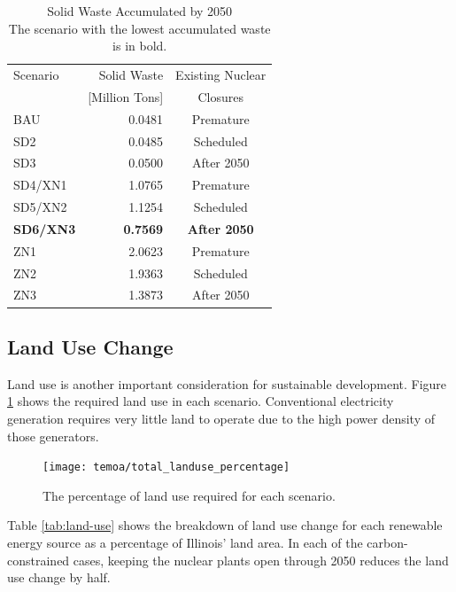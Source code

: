 \begin{table}[H]
  \centering
  \caption{Solid Waste Accumulated by 2050\\The scenario with the
  lowest accumulated waste is in bold.}
  \label{tab:total-waste}
  \begin{tabular}{lrc}
    \hline
    Scenario & Solid Waste & Existing Nuclear \\
    & [Million Tons]& Closures \\
    \hline
    BAU & 0.0481& Premature\\
    SD2 & 0.0485& Scheduled\\
    SD3 & 0.0500& After 2050\\
    SD4/XN1 & 1.0765 & Premature\\
    SD5/XN2 & 1.1254& Scheduled\\
    \textbf{SD6/XN3} & \textbf{0.7569}& \textbf{After 2050}\\
    ZN1 & 2.0623& Premature\\
    ZN2 & 1.9363& Scheduled\\
    ZN3 & 1.3873& After 2050\\
    \hline
  \end{tabular}
\end{table}

\subsection{Land Use Change}

Land use is another important consideration for sustainable development. Figure
\ref{fig:land-use-percentage} shows the required land use in each scenario.
Conventional electricity generation requires very little land to operate due
to the high power density of those generators.

\begin{figure}[H]
  \centering
  \texttt{[image: temoa/total\_landuse\_percentage]}
  \caption{The percentage of land use required for each scenario.}
  \label{fig:land-use-percentage}
\end{figure}

Table \ref{tab:land-use} shows the breakdown of land use change for each
renewable energy source as a percentage of Illinois' land area. In each of the
carbon-constrained cases, keeping the nuclear plants open through 2050 reduces
the land use change by half.

